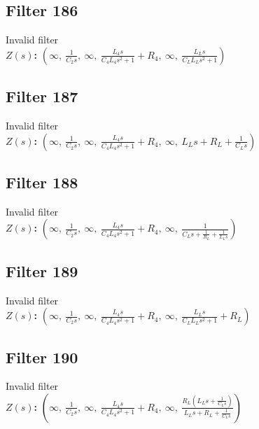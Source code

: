 \documentclass{article}
\begin{document}
\subsection*{Filter 186}
Invalid filter \\ 
\textbf{$Z(s)$:} $\left( \infty, \  \frac{1}{C_{2} s}, \  \infty, \  \frac{L_{4} s}{C_{4} L_{4} s^{2} + 1} + R_{4}, \  \infty, \  \frac{L_{L} s}{C_{L} L_{L} s^{2} + 1}\right)$ \\ 
\subsection*{Filter 187}
Invalid filter \\ 
\textbf{$Z(s)$:} $\left( \infty, \  \frac{1}{C_{2} s}, \  \infty, \  \frac{L_{4} s}{C_{4} L_{4} s^{2} + 1} + R_{4}, \  \infty, \  L_{L} s + R_{L} + \frac{1}{C_{L} s}\right)$ \\ 
\subsection*{Filter 188}
Invalid filter \\ 
\textbf{$Z(s)$:} $\left( \infty, \  \frac{1}{C_{2} s}, \  \infty, \  \frac{L_{4} s}{C_{4} L_{4} s^{2} + 1} + R_{4}, \  \infty, \  \frac{1}{C_{L} s + \frac{1}{R_{L}} + \frac{1}{L_{L} s}}\right)$ \\ 
\subsection*{Filter 189}
Invalid filter \\ 
\textbf{$Z(s)$:} $\left( \infty, \  \frac{1}{C_{2} s}, \  \infty, \  \frac{L_{4} s}{C_{4} L_{4} s^{2} + 1} + R_{4}, \  \infty, \  \frac{L_{L} s}{C_{L} L_{L} s^{2} + 1} + R_{L}\right)$ \\ 
\subsection*{Filter 190}
Invalid filter \\ 
\textbf{$Z(s)$:} $\left( \infty, \  \frac{1}{C_{2} s}, \  \infty, \  \frac{L_{4} s}{C_{4} L_{4} s^{2} + 1} + R_{4}, \  \infty, \  \frac{R_{L} \left(L_{L} s + \frac{1}{C_{L} s}\right)}{L_{L} s + R_{L} + \frac{1}{C_{L} s}}\right)$ \\ 
\end{document}
